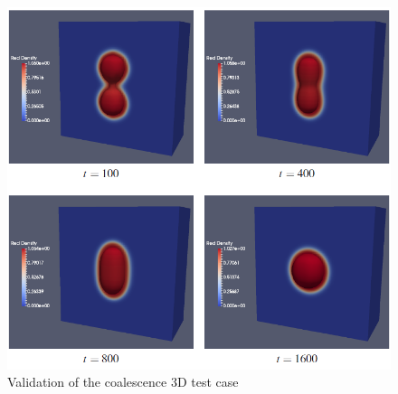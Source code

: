 \documentclass[12pt, openany]{book}
\begin{document}
    \begin{figure}[H]
       	\centering
       	\includegraphics[width=\linewidth]{Resources/Images/AntonioValid/Coalescence3D.PNG}
       	\caption{Validation of the coalescence 3D test case}
       	\label{fig:coal3D}
    \end{figure}
    
\end{document}
